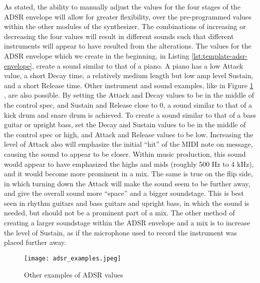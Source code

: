 As stated, the ability to manually adjust the values for the four stages of the ADSR envelope will allow for greater flexibility, over the pre-programmed values within the other modules of the synthesizer. The combinations of increasing or decreasing the four values will result in different sounds such that different instruments will appear to have resulted from the alterations. The values for the ADSR envelope which we create in the beginning, in Listing \ref{lst:template-adsr-envelope}, create a sound similar to that of a piano. A piano has a low Attack value, a short Decay time, a relatively medium length but low amp level Sustain, and a short Release time. Other instrument and sound examples, like in Figure \ref{fig:adsr-examples} \cite{Swisher_2019}, are also possible. By setting the Attack and Decay values to be in the middle of the control spec, and Sustain and Release close to 0, a sound similar to that of a kick drum and snare drum is achieved. To create a sound similar to that of a bass guitar or upright bass, set the Decay and Sustain values to be in the middle of the control spec or high, and Attack and Release values to be low. Increasing the level of Attack also will emphasize the initial ``hit'' of the MIDI note on message, causing the sound to appear to be closer. Within music production, this sound would appear to have emphasized the highs and mids (roughly 500 Hz to 4 kHz), and it would become more prominent in a mix. The same is true on the flip side, in which turning down the Attack will make the sound seem to be further away, and give the overall sound more ``space'' and a bigger soundstage. This is best seen in rhythm guitars and bass guitars and upright bass, in which the sound is needed, but should not be a prominent part of a mix. The other method of creating a larger soundstage within the ADSR envelope and a mix is to increase the level of Sustain, as if the microphone used to record the instrument was placed further away. 

\begin{figure}
  \centering
  \texttt{[image: adsr\_examples.jpeg]}
  \caption{Other examples of ADSR values}
  \label{fig:adsr-examples}
\end{figure}
